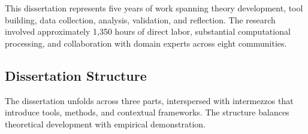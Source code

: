 \documentclass[../main.tex]{subfiles}
\begin{document}
This dissertation represents five years of work spanning theory development, tool building, data collection, analysis, validation, and reflection. The research involved approximately 1,350 hours of direct labor, substantial computational processing, and collaboration with domain experts across eight communities.

\subsection{Dissertation Structure}

The dissertation unfolds across three parts, interspersed with intermezzos that introduce tools, methods, and contextual frameworks. The structure balances theoretical development with empirical demonstration.
\end{document}
